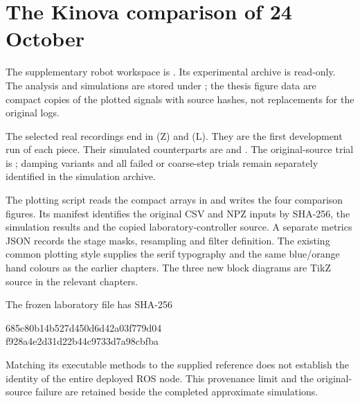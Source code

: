 \section{The Kinova comparison of 24 October}

The supplementary robot workspace is . Its experimental archive  is read-only. The analysis and simulations are stored under ; the thesis figure data are compact copies of the plotted signals with source hashes, not replacements for the original logs.

The selected real recordings end in  (Z) and  (L). They are the first development run of each piece. Their simulated counterparts are  and . The original-source trial is ; damping variants and all failed or coarse-step trials remain separately identified in the simulation archive.

The plotting script  reads the compact arrays in  and writes the four comparison figures. Its manifest identifies the original CSV and NPZ inputs by SHA-256, the simulation results and the copied laboratory-controller source. A separate metrics JSON records the stage masks, resampling and filter definition. The existing common plotting style supplies the serif typography and the same blue/orange hand colours as the earlier chapters. The three new block diagrams are TikZ source in the relevant chapters.

The frozen laboratory file has SHA-256
\begin{center}\footnotesize\ttfamily
685c80b14b527d450d6d42a03f779d04\\
f928a4e2d31d22b44c9733d7a98cbfba
\end{center}
Matching its executable methods to the supplied reference does not establish the identity of the entire deployed ROS node. This provenance limit and the original-source failure are retained beside the completed approximate simulations.

